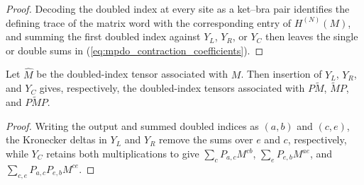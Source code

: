 \begin{proof}
    \leanok
    Decoding the doubled index at every site as a ket--bra pair identifies the
    defining trace of the matrix word with the corresponding entry of
    $H^{(N)}(M)$, and summing the first doubled index against $Y_L$, $Y_R$, or
    $Y_C$ then leaves the single or double sums in
    (\ref{eq:mpdo_contraction_coefficients}).
\end{proof}

\begin{lemma}
    \label{lem:mpdo_first_site_insertions_vertical_mul}
    \leanok
    Let $\widehat M$ be the doubled-index tensor associated with $M$. Then
    insertion of $Y_L$, $Y_R$, and $Y_C$ gives, respectively, the
    doubled-index tensors associated with
    $P\widetilde M$, $\widetilde MP$, and $P\widetilde MP$.
\end{lemma}

\begin{proof}
    \leanok
    Writing the output and summed doubled indices as $(a,b)$ and $(c,e)$,
    the Kronecker deltas in $Y_L$ and $Y_R$ remove the sums over $e$ and $c$,
    respectively, while $Y_C$ retains both multiplications to give
    $\sum_c P_{a,c}M^{cb}$,
    $\sum_e P_{e,b}M^{ae}$, and
    $\sum_{c,e}P_{a,c}P_{e,b}M^{ce}$.
\end{proof}

